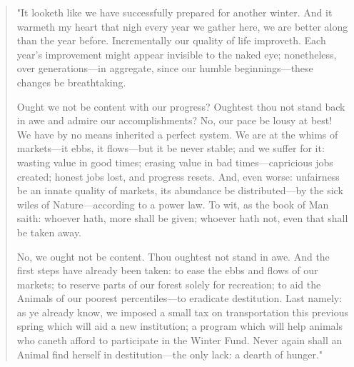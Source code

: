 \begingroup
	\fontsize{10pt}{12pt}\selectfont
		\begin{quote}

			"It looketh like we have successfully prepared for another winter. And it warmeth my heart that nigh every year we gather here, we are better along than the year before. Incrementally our quality of life improveth. Each year's improvement might appear invisible to the naked eye; nonetheless, over generations---in aggregate, since our humble beginnings---these changes be breathtaking.
			
			Ought we not be content with our progress? Oughtest thou not stand back in awe and admire our accomplishments?
			No, our pace be lousy at best! We have by no means inherited a perfect system. We are at the whims of markets---it ebbs, it flows---but it be never stable; and we suffer for it: wasting value in good times; erasing value in bad times---capricious jobs created; honest jobs lost, and progress resets. And, even worse: unfairness be an innate quality of markets, its abundance be distributed---by the sick wiles of Nature---according to a power law. To wit, as the book of Man saith: whoever hath, more shall be given; whoever hath not, even that shall be taken away.
			
			No, we ought not be content. Thou oughtest not stand in awe. And the first steps have already been taken: to ease the ebbs and flows of our markets; to reserve parts of our forest solely for recreation; to aid the Animals of our poorest percentiles---to eradicate destitution. Last namely: as ye already know, we imposed a small tax on transportation this previous spring which will aid a new institution; a program which will help animals who caneth afford to participate in the Winter Fund. Never again shall an Animal find herself in destitution---the only lack: a dearth of hunger."
		\end{quote}
\endgroup